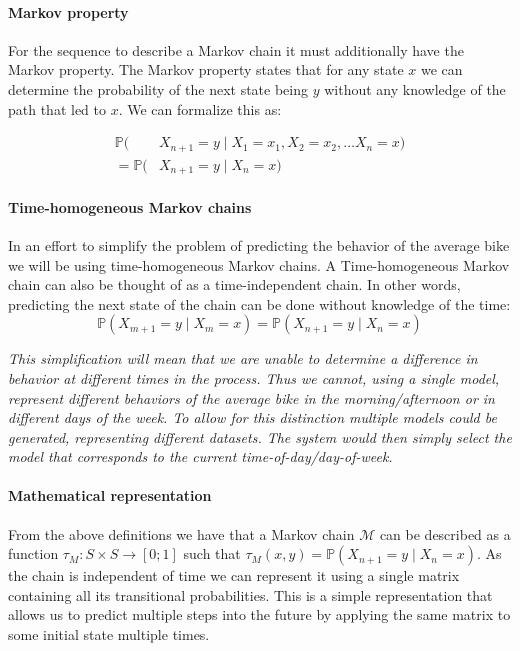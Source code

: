 \paragraph{Markov property}\label{markov:property}
For the sequence to describe a Markov chain it must additionally have the Markov property.
The Markov property states that for any state $x$ we can determine the probability of the next state being $y$ without any knowledge of the path that led to $x$.
We can formalize this as:

\begin{align}\label{markov:eq:markov_prob}
\mathbb{P}(&X_{n+1} = y \mid X_1 = x_1, X_2 = x_2, \dots X_n = x)\nonumber\\
= \mathbb{P}(&X_{n+1} = y \mid X_n = x)
\end{align}

\paragraph{Time-homogeneous Markov chains}
In an effort to simplify the problem of predicting the behavior of the average bike we will be using time-homogeneous Markov chains.
A Time-homogeneous Markov chain can also be thought of as a time-independent chain.
In other words, predicting the next state of the chain can be done without knowledge of the time:
\begin{equation}
\mathbb{P}(X_{m+1} = y \mid X_m = x) = \mathbb{P}(X_{n+1} = y \mid X_n = x)
\end{equation}

\textit{This simplification will mean that we are unable to determine a difference in behavior at different times in the process.
Thus we cannot, using a single model, represent different behaviors of the average bike in the morning/afternoon or in different days of the week.
To allow for this distinction multiple models could be generated, representing different datasets.
The system would then simply select the model that corresponds to the current time-of-day/day-of-week.}

\paragraph{Mathematical representation}
From the above definitions we have that a Markov chain $\mathcal{M}$ can be described as a function $\tau_M:S\times S \rightarrow [0;1]$ such that $\tau_M(x, y) = \mathbb{P}(X_{n + 1} = y \mid X_n = x)$.
As the chain is independent of time we can represent it using a single matrix containing all its transitional probabilities.
This is a simple representation that allows us to predict multiple steps into the future by applying the same matrix to some initial state multiple times.

